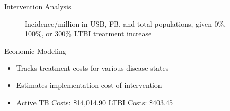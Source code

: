 \documentclass[final]{beamer}
\begin{document}
\begin{frame}
\begin{columns}[T]
\begin{column}{.3\textwidth}
\begin{block}{Intervention Analysis}
\begin{figure}[h]
\begin{minipage}[c]{0.6\textwidth}
          \end{minipage}
          \hspace{0.5em}
          \begin{minipage}[c]{0.35\textwidth}
            \caption{Incidence/million in USB, FB, and total populations,
                     given 0\%, 100\%, or 300\% LTBI treatment increase}
          \end{minipage}
          \label{fig:incLTBItrmt_incidence}
        \end{figure}
      \end{block}
      \begin{block}{Economic Modeling}
        \begin{itemize}
          \item Tracks treatment costs for various disease states
          \item Estimates implementation cost of intervention
          \item Active TB Costs: \$14,014.90 LTBI Costs: \$403.45
            
        \end{itemize}
        \vspace{.5em}
            \begin{figure}[h]



\end{figure}
\end{block}
\end{column}
\end{columns}
\end{frame}
\end{document}
